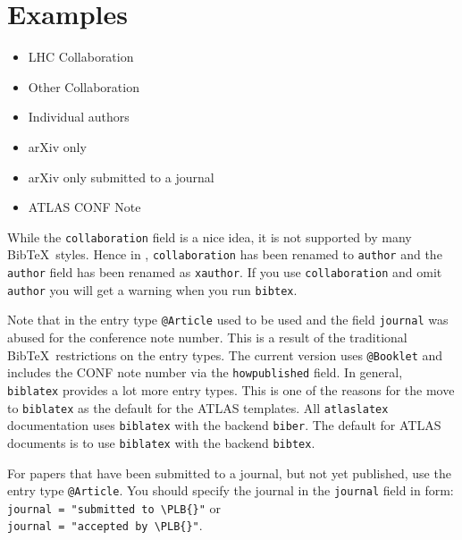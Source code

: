 \documentclass[UKenglish,texlive=2013]{latex/atlasdoc}
\newcommand*{\BibTeX}{Bib\TeX}
\newcommand{\Macro}[1]{\texttt{\textbackslash #1}\xspace}
\newcommand{\Package}[1]{\texttt{#1}\xspace}
\begin{document}
\section{Examples}

\begin{itemize}
\item LHC Collaboration~\cite{lhcCollaboration:2012}
\item Other Collaboration~\cite{otherCollaboration:2007}
\item Individual authors~\cite{authors:2008}
\item arXiv only~\cite{arxivOnly:2009}
\item arXiv only submitted to a journal~\cite{arxivSub:2011}
\item ATLAS CONF Note~\cite{atlasConf:2012}
\end{itemize}

While the \texttt{collaboration} field is a nice idea, it is not supported by many \BibTeX\ styles.
Hence in , \texttt{collaboration} has been renamed to \texttt{author} and
the \texttt{author} field has been renamed as \texttt{xauthor}. If you use \texttt{collaboration} and omit
\texttt{author} you will get a warning when you run \texttt{bibtex}.

Note that in  the entry type \texttt{@Article} used to be used and the field \texttt{journal} 
was abused for the conference note number. This is a result of the traditional \BibTeX\ restrictions on the entry types.
The current version uses \texttt{@Booklet} and includes the CONF note number via the \texttt{howpublished} field.
In general, \texttt{biblatex} provides a lot more entry types.
This is one of the reasons for the  move to \texttt{biblatex} as the default for the ATLAS templates.
All \Package{atlaslatex} documentation uses \Package{biblatex} with the backend \Package{biber}.
The default for ATLAS documents is to use \Package{biblatex} with the backend \Package{bibtex}.

For papers that have been submitted to a journal, but not yet published, use the entry type \texttt{@Article}.
You should specify the journal in the \texttt{journal} field in form:\\
\texttt{journal = "submitted to \Macro{PLB}{}\{\}"} or\\
\texttt{journal = "accepted by \Macro{PLB}{}\{\}"}.
\end{document}
